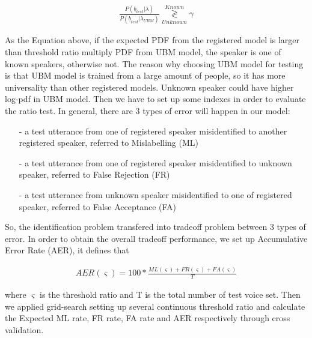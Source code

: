 \documentclass[12pt,DIV14,BCOR12mm,a4paper,footinclude=false,headinclude,parskip=half-,twoside,openright,cleardoublepage=empty,toc=index,bibliography=totoc,listof=totoc]{scrreprt}
\numberwithin{equation}{chapter}
\begin{document}
\begin{align}
\frac{P(\underline{b}_{test}|\lambda)}{P(\underline{b}_{test}|\lambda_{UBM})}\underset{Unknown}{\overset{Known}{\gtrless}}\gamma
\end{align}

As the Equation above, if the expected PDF from the registered model is larger than threshold ratio multiply PDF from UBM model, the speaker is one of known speakers, otherwise not. The reason why choosing UBM model for testing is that UBM model is trained from a large amount of people, so it has more universality than other registered models. Unknown speaker could have higher log-pdf in UBM model. Then we have to set up some indexes in order to evaluate the ratio test. In general, there are 3 types of error will happen in our model:

\begin{itemize}
	\item[-] a test utterance from one of registered speaker misidentified to another registered speaker, referred to Mislabelling (ML)
	\item[-] a test utterance from one of registered speaker misidentified to unknown speaker, referred to False Rejection (FR)
	\item[-] a test utterance from unknown speaker misidentified to one of registered speaker, referred to False Acceptance (FA)
\end{itemize}

So, the identification problem transfered into tradeoff problem between 3 types of error. In order to obtain the overall tradeoff performance, we set up Accumulative Error Rate (AER), it defines that

\begin{align}
AER(\varsigma)=100*\frac{ML(\varsigma)+FR(\varsigma)+FA(\varsigma)}{T}
\end{align}

where $\varsigma$ is the threshold ratio and T is the total number of test voice set. Then we applied grid-search setting up several continuous threshold ratio and calculate the Expected ML rate, FR rate, FA rate and AER respectively through cross validation.
\end{document}
